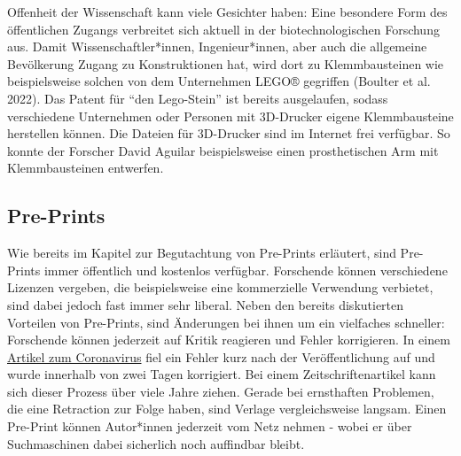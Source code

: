 \documentclass[
  letterpaper,
  DIV=11,
  numbers=noendperiod]{scrreprt}
\begin{document}
\begin{tcolorbox}[enhanced jigsaw, title=\textcolor{quarto-callout-note-color}{\faInfo}\hspace{0.5em}{Offenheit durch Klemmbausteine}, colbacktitle=quarto-callout-note-color!10!white, rightrule=.15mm, titlerule=0mm, left=2mm, bottomrule=.15mm, arc=.35mm, leftrule=.75mm, toprule=.15mm, opacityback=0, breakable, bottomtitle=1mm, colframe=quarto-callout-note-color-frame, toptitle=1mm, opacitybacktitle=0.6, coltitle=black, colback=white]

Offenheit der Wissenschaft kann viele Gesichter haben: Eine besondere
Form des öffentlichen Zugangs verbreitet sich aktuell in der
biotechnologischen Forschung aus. Damit Wissenschaftler*innen,
Ingenieur*innen, aber auch die allgemeine Bevölkerung Zugang zu
Konstruktionen hat, wird dort zu Klemmbausteinen wie beispielsweise
solchen von dem Unternehmen LEGO® gegriffen (Boulter et al. 2022). Das
Patent für ``den Lego-Stein'' ist bereits ausgelaufen, sodass
verschiedene Unternehmen oder Personen mit 3D-Drucker eigene
Klemmbausteine herstellen können. Die Dateien für 3D-Drucker sind im
Internet frei verfügbar. So konnte der Forscher David Aguilar
beispielsweise einen prosthetischen Arm mit Klemmbausteinen entwerfen.

\end{tcolorbox}

\subsection{Pre-Prints}\label{pre-prints}

Wie bereits im Kapitel zur Begutachtung von Pre-Prints erläutert, sind
Pre-Prints immer öffentlich und kostenlos verfügbar. Forschende können
verschiedene Lizenzen vergeben, die beispielsweise eine kommerzielle
Verwendung verbietet, sind dabei jedoch fast immer sehr liberal. Neben
den bereits diskutierten Vorteilen von Pre-Prints, sind Änderungen bei
ihnen um ein vielfaches schneller: Forschende können jederzeit auf
Kritik reagieren und Fehler korrigieren. In einem
\href{https://www.statnews.com/2020/02/03/retraction-faulty-coronavirus-paper-good-moment-for-science/}{Artikel
zum Coronavirus} fiel ein Fehler kurz nach der Veröffentlichung auf und
wurde innerhalb von zwei Tagen korrigiert. Bei einem
Zeitschriftenartikel kann sich dieser Prozess über viele Jahre ziehen.
Gerade bei ernsthaften Problemen, die eine Retraction zur Folge haben,
sind Verlage vergleichsweise langsam. Einen Pre-Print können Autor*innen
jederzeit vom Netz nehmen - wobei er über Suchmaschinen dabei sicherlich
noch auffindbar bleibt.
\end{document}
